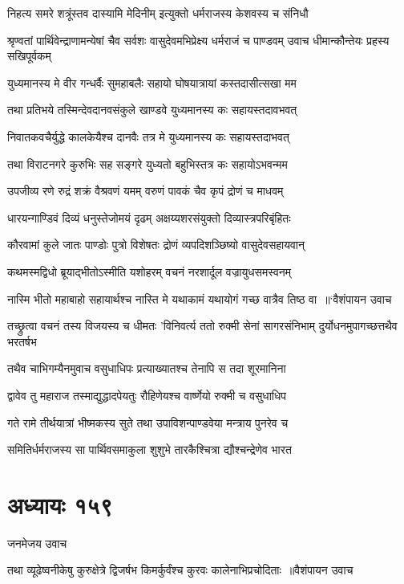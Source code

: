 \twolineshloka
{निहत्य समरे शत्रूंस्तव दास्यामि मेदिनीम्}
{इत्युक्तो धर्मराजस्य केशवस्य च संनिधौ}


\threelineshloka
{श्रृण्वतां पार्थिवेन्द्राणामन्येषां चैव सर्वशः}
{वासुदेवमभिप्रेक्ष्य धर्मराजं च पाण्डवम्}
{उवाच धीमान्कौन्तेयः प्रहस्य सखिपूर्वकम्}


\twolineshloka
{युध्यमानस्य मे वीर गन्धर्वैः सुमहाबलैः}
{सहायो घोषयात्रायां कस्तदासीत्सखा मम}


\twolineshloka
{तथा प्रतिभये तस्मिन्देवदानवसंकुले}
{खाण्डवे युध्यमानस्य कः सहायस्तदावभवत्}


\twolineshloka
{निवातकवचैर्युद्धे कालकेयैश्च दानवैः}
{तत्र मे युध्यमानस्य कः सहायस्तदाभवत्}


\twolineshloka
{तथा विराटनगरे कुरुभिः सह सङ्गरे}
{युध्यतो बहुभिस्तत्र कः सहायोऽभवन्मम}


\twolineshloka
{उपजीव्य रणे रुद्रं शक्रं वैश्रवणं यमम्}
{वरुणं पावकं चैव कृपं द्रोणं च माधवम्}


\twolineshloka
{धारयन्गाण्डिवं दिव्यं धनुस्तेजोमयं दृढम्}
{अक्षय्यशरसंयुक्तो दिव्यास्त्रपरिबृंहितः}


\twolineshloka
{कौरवामां कुले जातः पाण्डोः पुत्रो विशेषतः}
{द्रोणं व्यपदिशञ्छिष्यो वासुदेवसहायवान्}


\twolineshloka
{कथमस्मद्विधो ब्रूयाद्भीतोऽस्मीति यशोहरम्}
{वचनं नरशार्दूल वज्रायुधसमस्वनम्}


\twolineshloka
{नास्मि भीतो महाबाहो सहायार्थश्च नास्ति मे}
{यथाकामं यथायोगं गच्छ वात्रैव तिष्ठ वा ॥`वैशंपायन उवाच}


\threelineshloka
{तच्छ्रुत्वा वचनं तस्य विजयस्य च धीमतः}
{'विनिवर्त्य ततो रुक्मी सेनां सागरसंनिभाम्}
{दुर्योधनमुपागच्छत्तथैव भरतर्षभ}


\twolineshloka
{तथैव चाभिगम्यैनमुवाच वसुधाधिपः}
{प्रत्याख्यातश्च तेनापि स तदा शूरमानिना}


\twolineshloka
{द्वावेव तु महाराज तस्माद्युद्धादपेयतुः}
{रौहिणेयश्च वार्ष्णेयो रुक्मी च वसुधाधिप}


\twolineshloka
{गते रामे तीर्थयात्रां भीष्मकस्य सुते तथा}
{उपाविशन्पाण्डवेया मन्त्राय पुनरेव च}


\twolineshloka
{समितिर्धर्मराजस्य सा पार्थिवसमाकुला}
{शुशुभे तारकैश्चित्रा द्यौश्चन्द्रेणेव भारत}


\chapter{अध्यायः १५९}
\twolineshloka
{जनमेजय उवाच}
{}


\threelineshloka
{तथा व्यूढेष्वनीकेषु कुरुक्षेत्रे द्विजर्षभ}
{किमर्कुर्वंश्च कुरवः कालेनाभिप्रचोदिताः ॥वैशंपायन उवाच}
{}


